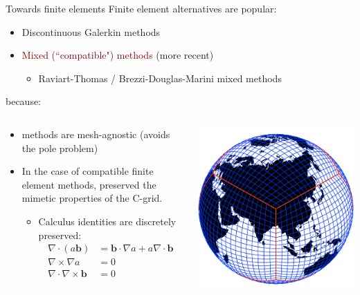 \documentclass[9pt]{beamer}
\renewcommand\vec{\mathbf}
\begin{document}
\begin{frame}[c]{Towards finite elements}
	Finite element alternatives are popular:
	\begin{itemize}
		\item Discontinuous Galerkin methods
		\item \textcolor{maroon}{Mixed (``compatible") methods} (more recent)
		\begin{itemize}
			\item Raviart-Thomas / Brezzi-Douglas-Marini mixed methods
		\end{itemize}
	\end{itemize}
because:
	\begin{columns}
	\begin{column}{0.5\textwidth}
		\begin{itemize}
			\item methods are mesh-agnostic (avoids the pole problem)
			\item In the case of compatible finite element methods,
			preserved the mimetic properties of the C-grid.
			\begin{itemize}
				\item Calculus identities are discretely preserved:
				\begin{align*}
					\nabla\cdot(a\vec{b}) &= \vec{b}\cdot\nabla a + a\nabla\cdot\vec{b}\\
					\nabla\times\nabla a &= 0 \\
					\nabla\cdot\nabla\times\vec{b} &= 0
				\end{align*}
			\end{itemize}
		\end{itemize}
	\end{column}
	\hspace{-20pt}\begin{column}{0.5\textwidth}
		\begin{center}
			\vspace{-20pt}\includegraphics[width=\textwidth]{figures/cubed_sphere_mesh}

\end{center}
\end{column}
\end{columns}
\end{frame}
\end{document}
